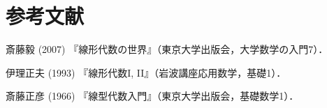 \documentclass[uplatex, dvipdfmx]{jsreport}
\begin{document}
\chapter{参考文献}


\begin{thebibliography}{99}
    \item
    斎藤毅 (2007) 『線形代数の世界』（東京大学出版会，大学数学の入門7）．
    \item
    伊理正夫 (1993) 『線形代数I, II』（岩波講座応用数学，基礎1）．
    \item
    斎藤正彦 (1966) 『線型代数入門』（東京大学出版会，基礎数学1）．
\end{thebibliography}
\end{document}
